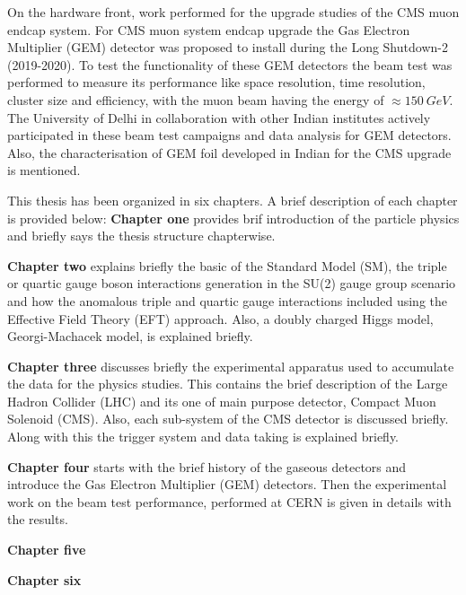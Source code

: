 On the hardware front, work performed for the upgrade studies of the CMS muon endcap system. For CMS muon system endcap upgrade the Gas Electron Multiplier (GEM) detector was proposed to install during the Long Shutdown-2 (2019-2020). To test the functionality of these GEM detectors the beam test was performed to measure its performance like space resolution, time resolution, cluster size and efficiency, with the muon beam having the energy of $\approx 150~GeV$. The University of Delhi in collaboration with other Indian institutes actively participated in these beam test campaigns and data analysis for GEM detectors. Also, the characterisation of GEM foil developed in Indian for the CMS upgrade is mentioned.


This thesis has been organized in six chapters. A brief description of each chapter is provided below:
\textbf{Chapter one} provides brif introduction of the particle physics and briefly says the thesis structure chapterwise.

\textbf{Chapter two} explains briefly the basic of the Standard Model (SM), the triple or quartic gauge boson interactions generation in the SU(2) gauge group scenario and how the anomalous triple and quartic gauge interactions included using the Effective Field Theory (EFT) approach. Also, a doubly charged Higgs model, Georgi-Machacek model, is explained briefly.

\textbf{Chapter three} discusses briefly the experimental apparatus used to accumulate the data for the physics studies. This contains the brief description of the Large Hadron Collider (LHC) and its one of main purpose detector, Compact Muon Solenoid (CMS). Also, each sub-system of the CMS detector is discussed briefly. Along with this the trigger system and data taking is explained briefly.

\textbf{Chapter four} starts with the brief history of the gaseous detectors and introduce the Gas Electron Multiplier (GEM) detectors. Then the experimental work on the beam test performance, performed at CERN is given in details with the results. 

\textbf{Chapter five} 

\textbf{Chapter six}